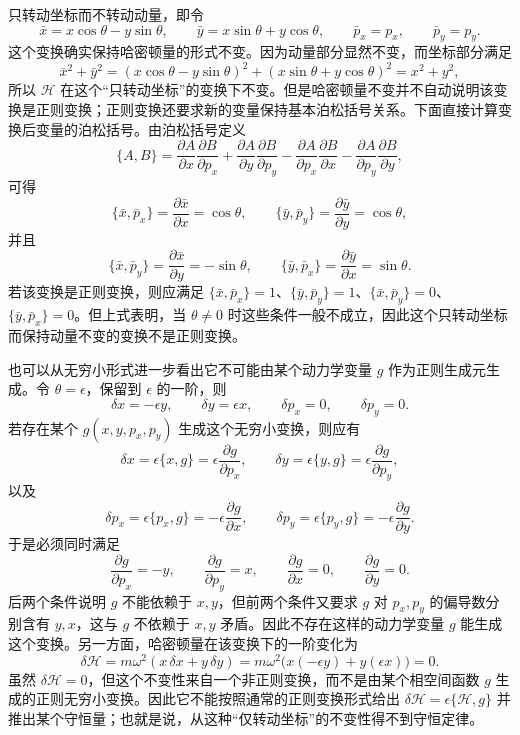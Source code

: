 \begin{solution}[非正则变换]
\answer
只转动坐标而不转动动量，即令
\[
\bar x=x\cos\theta-y\sin\theta,\qquad \bar y=x\sin\theta+y\cos\theta,\qquad \bar p_x=p_x,\qquad \bar p_y=p_y.
\]
这个变换确实保持哈密顿量的形式不变。因为动量部分显然不变，而坐标部分满足
\[
\bar x^2+\bar y^2=(x\cos\theta-y\sin\theta)^2+(x\sin\theta+y\cos\theta)^2=x^2+y^2,
\]
所以 $\mathcal H$ 在这个“只转动坐标”的变换下不变。但是哈密顿量不变并不自动说明该变换是正则变换；正则变换还要求新的变量保持基本泊松括号关系。下面直接计算变换后变量的泊松括号。由泊松括号定义
\[
\{A,B\}=\frac{\partial A}{\partial x}\frac{\partial B}{\partial p_x}+\frac{\partial A}{\partial y}\frac{\partial B}{\partial p_y}-\frac{\partial A}{\partial p_x}\frac{\partial B}{\partial x}-\frac{\partial A}{\partial p_y}\frac{\partial B}{\partial y},
\]
可得
\[
\{\bar x,\bar p_x\}=\frac{\partial \bar x}{\partial x}=\cos\theta,\qquad
\{\bar y,\bar p_y\}=\frac{\partial \bar y}{\partial y}=\cos\theta,
\]
并且
\[
\{\bar x,\bar p_y\}=\frac{\partial \bar x}{\partial y}=-\sin\theta,\qquad
\{\bar y,\bar p_x\}=\frac{\partial \bar y}{\partial x}=\sin\theta.
\]
若该变换是正则变换，则应满足 $\{\bar x,\bar p_x\}=1$、$\{\bar y,\bar p_y\}=1$、$\{\bar x,\bar p_y\}=0$、$\{\bar y,\bar p_x\}=0$。但上式表明，当 $\theta\neq 0$ 时这些条件一般不成立，因此这个只转动坐标而保持动量不变的变换不是正则变换。

也可以从无穷小形式进一步看出它不可能由某个动力学变量 $g$ 作为正则生成元生成。令 $\theta=\epsilon$，保留到 $\epsilon$ 的一阶，则
\[
\delta x=-\epsilon y,\qquad \delta y=\epsilon x,\qquad \delta p_x=0,\qquad \delta p_y=0.
\]
若存在某个 $g(x,y,p_x,p_y)$ 生成这个无穷小变换，则应有
\[
\delta x=\epsilon\{x,g\}=\epsilon\frac{\partial g}{\partial p_x},\qquad
\delta y=\epsilon\{y,g\}=\epsilon\frac{\partial g}{\partial p_y},
\]
以及
\[
\delta p_x=\epsilon\{p_x,g\}=-\epsilon\frac{\partial g}{\partial x},\qquad
\delta p_y=\epsilon\{p_y,g\}=-\epsilon\frac{\partial g}{\partial y}.
\]
于是必须同时满足
\[
\frac{\partial g}{\partial p_x}=-y,\qquad \frac{\partial g}{\partial p_y}=x,\qquad \frac{\partial g}{\partial x}=0,\qquad \frac{\partial g}{\partial y}=0.
\]
后两个条件说明 $g$ 不能依赖于 $x,y$，但前两个条件又要求 $g$ 对 $p_x,p_y$ 的偏导数分别含有 $y,x$，这与 $g$ 不依赖于 $x,y$ 矛盾。因此不存在这样的动力学变量 $g$ 能生成这个变换。另一方面，哈密顿量在该变换下的一阶变化为
\[
\delta\mathcal H=m\omega^2(x\,\delta x+y\,\delta y)=m\omega^2\bigl(x(-\epsilon y)+y(\epsilon x)\bigr)=0.
\]
虽然 $\delta\mathcal H=0$，但这个不变性来自一个非正则变换，而不是由某个相空间函数 $g$ 生成的正则无穷小变换。因此它不能按照通常的正则变换形式给出 $\delta\mathcal H=\epsilon\{\mathcal H,g\}$ 并推出某个守恒量；也就是说，从这种“仅转动坐标”的不变性得不到守恒定律。
\end{solution}


